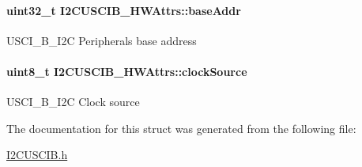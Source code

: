 \paragraph[{base\+Addr}]{\setlength{\rightskip}{0pt plus 5cm}uint32\+\_\+t I2\+C\+U\+S\+C\+I\+B\+\_\+\+H\+W\+Attrs\+::base\+Addr}\label{struct_i2_c_u_s_c_i_b___h_w_attrs_ac86e653a2babe8e0e8c20d044d7f87ad}
U\+S\+C\+I\+\_\+\+B\+\_\+\+I2\+C Peripheral\textquotesingle{}s base address 
\paragraph[{clock\+Source}]{\setlength{\rightskip}{0pt plus 5cm}uint8\+\_\+t I2\+C\+U\+S\+C\+I\+B\+\_\+\+H\+W\+Attrs\+::clock\+Source}\label{struct_i2_c_u_s_c_i_b___h_w_attrs_aca93346c6e87c42ee11c3742bd85e79d}
U\+S\+C\+I\+\_\+\+B\+\_\+\+I2\+C Clock source 

The documentation for this struct was generated from the following file\+:\begin{DoxyCompactItemize}
\item 
\hyperlink{_i2_c_u_s_c_i_b_8h}{I2\+C\+U\+S\+C\+I\+B.\+h}\end{DoxyCompactItemize}
